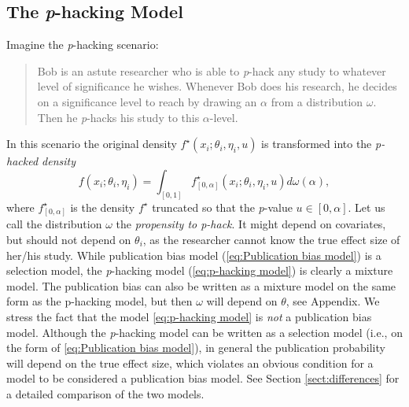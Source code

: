 \documentclass{article}
\theoremstyle{plain}
\theoremstyle{definition}
\begin{document}
\subsection{The \textit{p}-hacking Model}\label{subsect:p-hacking}

Imagine the \textit{p}-hacking scenario:
\begin{quote}
Bob is an astute researcher who is able to \textit{p}-hack any study to whatever level of significance he wishes. Whenever Bob does his research, he decides on a significance level to reach by drawing an $\alpha$ from a distribution $\omega$. Then he \textit{p}-hacks his study to this $\alpha$-level.
\end{quote}
In this scenario the original density $f^{\star}\left(x_{i};\theta_{i},\eta_{i}, u\right)$
is transformed into the \emph{p-hacked density}
\begin{equation}\label{eq:p-hacking model}
f\left(x_{i};\theta_{i},\eta_{i}\right)=\int_{[0,1]}f_{\left[0,\alpha\right]}^{\star}\left(x_{i};\theta_{i},\eta_{i}, u\right)d\omega\left(\alpha\right),
\end{equation}
where $f_{\left[0,\alpha\right]}^{\star}$ is the density $f^{\star}$ truncated so that the \emph{p}-value $u\in\left[0,\alpha\right]$. Let us call the distribution $\omega$ the \emph{propensity to p-hack}. It might depend on covariates, but should not depend on $\theta_{i}$, as the researcher cannot know the true effect size of her/his study. While publication bias model (\ref{eq:Publication bias model}) is a selection model, the \textit{p}-hacking model (\ref{eq:p-hacking model}) is clearly a mixture model. The publication bias can also be written as a mixture model on the same form as the p-hacking model, but then $\omega$ will depend on $\theta$, see Appendix. We stress the fact that the model \eqref{eq:p-hacking model} is \emph{not} a publication bias model. Although the \textit{p}-hacking model can be written as a selection model (i.e., on the form of \eqref{eq:Publication bias model}), in general the publication probability will depend on the true effect size, which violates an obvious condition for a model to be considered a publication bias model. See Section \ref{sect:differences} for a detailed comparison of the two models.
\end{document}
